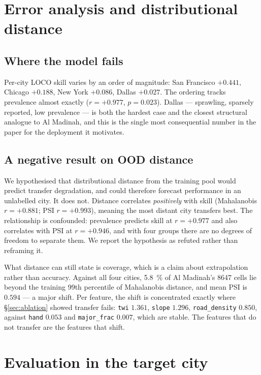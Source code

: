 \documentclass[11pt]{article}
\begin{document}
\section{Error analysis and distributional distance}\label{sec:ood}

\subsection{Where the model fails}
Per-city LOCO skill varies by an order of magnitude: San Francisco $+0.441$,
Chicago $+0.188$, New York $+0.086$, Dallas $+0.027$. The ordering tracks
prevalence almost exactly ($r = +0.977$, $p = 0.023$). Dallas --- sprawling,
sparsely reported, low prevalence --- is both the hardest case and the closest
structural analogue to Al Madinah, and this is the single most consequential
number in the paper for the deployment it motivates.

\subsection{A negative result on OOD distance}
We hypothesised that distributional distance from the training pool would
predict transfer degradation, and could therefore forecast performance in an
unlabelled city. It does not. Distance correlates \emph{positively} with skill
(Mahalanobis $r = +0.881$; PSI $r = +0.993$), meaning the most distant city
transfers best. The relationship is confounded: prevalence predicts skill at
$r = +0.977$ and also correlates with PSI at $r = +0.946$, and with four groups
there are no degrees of freedom to separate them. We report the hypothesis as
refuted rather than reframing it.

What distance can still state is coverage, which is a claim about extrapolation
rather than accuracy. Against all four cities, \SI{5.8}{\percent} of Al Madinah's
\num{8647} cells lie beyond the training 99th percentile of Mahalanobis distance,
and mean PSI is $0.594$ --- a major shift. Per feature, the shift is
concentrated exactly where \S\ref{sec:ablation} showed transfer fails:
\texttt{twi} $1.361$, \texttt{slope} $1.296$, \texttt{road\_density} $0.850$,
against \texttt{hand} $0.053$ and \texttt{major\_frac} $0.007$, which are stable.
The features that do not transfer are the features that shift.

\section{Evaluation in the target city}\label{sec:target}
\end{document}
